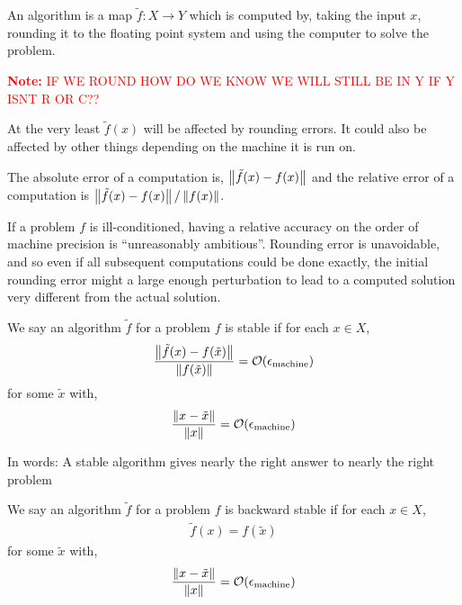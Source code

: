 \documentclass[12pt]{article}
\newcommand{\note}[1]{\textcolor{red}{\textbf{Note:} #1}}
\begin{document}
\begin{definition}[Algorithm]
An algorithm is a map \( \tilde{f}: X\to Y \) which is computed by, taking the input \( x \), rounding it to the floating point system and using the computer to solve the problem.
\end{definition}

\note{IF WE ROUND HOW DO WE KNOW WE WILL STILL BE IN Y IF Y ISNT R OR C??}

At the very least \( \tilde{f}(x) \) will be affected by rounding errors. It could also be affected by other things depending on the machine it is run on.

\begin{definition}
The absolute error of a computation is, \( \left\lVert\tilde{f}(x)-f(x)\right\rVert \) and the relative error of a computation is \( \left\lVert\tilde{f}(x)-f(x)\right\rVert/\left\lVert f(x)\right\rVert \).
\end{definition}

If a problem \( f \) is ill-conditioned, having a relative accuracy on the order of machine precision is ``unreasonably ambitious''. Rounding error is unavoidable, and so even if all subsequent computations could be done exactly, the initial rounding error might a large enough perturbation to lead to a computed solution very different from the actual solution.

\begin{definition}
We say an algorithm \( \tilde{f} \) for a problem \( f \) is stable if for each \( x\in X \),
\begin{align*}
    \dfrac{\left\lVert\tilde{f}(x)-f(\tilde{x})\right\rVert}{\left\lVert f(\tilde{x})\right\rVert} = \mathcal{O}(\epsilon_\text{machine})
\end{align*}
for some \( \tilde{x} \) with,
\begin{align*}
    \dfrac{\left\lVert x-\tilde{x}\right\rVert}{\left\lVert x\right\rVert} = \mathcal{O}(\epsilon_\text{machine})
\end{align*}
\end{definition}
In words: A stable algorithm gives nearly the right answer to nearly the right problem

\begin{definition}
We say an algorithm \( \tilde{f} \) for a problem \( f \) is backward stable if for each \( x\in X \),
\begin{align*}
    \tilde{f}(x) = f(\tilde{x})
\end{align*}
for some \( \tilde{x} \) with,
\begin{align*}
    \dfrac{\left\lVert x-\tilde{x}\right\rVert}{\left\lVert x\right\rVert} = \mathcal{O}(\epsilon_\text{machine})
\end{align*}
\end{definition}
\end{document}
